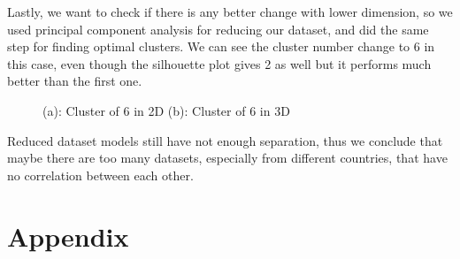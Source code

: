 \documentclass[11pt]{article} %
\begin{document}
\quad Lastly, we want to check if there is any better change with lower dimension, so we used principal component analysis for reducing our dataset, and did the same step for finding optimal clusters. We can see the cluster number change to 6 in this case, even though the silhouette plot gives 2 as well but it performs much better than the first one. 

\begin{figure}[H]
    \centering
    \caption{(a): Cluster of 6 in 2D (b): Cluster of 6 in 3D}
    \label{fig:foobar}
\end{figure}

\quad Reduced dataset models still have not enough separation, thus we conclude that maybe there are too many datasets, especially from different countries, that have no correlation between each other. 
\newpage
\section{Appendix}
\end{document}
